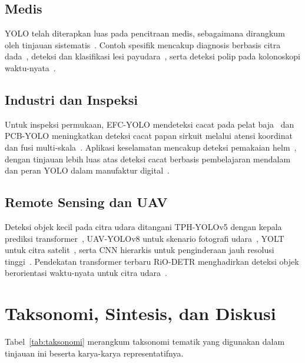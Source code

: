 \documentclass[11pt,a4paper]{article}
\begin{document}
\subsection{Medis}
YOLO telah diterapkan luas pada pencitraan medis, sebagaimana dirangkum oleh
tinjauan sistematis~\cite{qureshi2024medyolo}. Contoh spesifik mencakup diagnosis
berbasis citra dada~\cite{alantari2020covid}, deteksi dan klasifikasi lesi
payudara~\cite{baccouche2021breast,mohiyuddin2022breast}, serta deteksi polip
pada kolonoskopi waktu-nyata~\cite{wan2023polyp}.

\subsection{Industri dan Inspeksi}
Untuk inspeksi permukaan, EFC-YOLO mendeteksi cacat pada pelat
baja~\cite{yang2023efcyolo} dan PCB-YOLO meningkatkan deteksi cacat papan sirkuit
melalui atensi koordinat dan fusi multi-skala~\cite{tang2024pcbyolo}. Aplikasi
keselamatan mencakup deteksi pemakaian helm~\cite{zhou2021helmet}, dengan tinjauan
lebih luas atas deteksi cacat berbasis pembelajaran mendalam~\cite{jha2023defectreview}
dan peran YOLO dalam manufaktur digital~\cite{hussain2023yolo}.

\subsection{Remote Sensing dan UAV}
Deteksi objek kecil pada citra udara ditangani TPH-YOLOv5 dengan kepala prediksi
transformer~\cite{zhu2021tphyolov5}, UAV-YOLOv8 untuk skenario fotografi
udara~\cite{wang2023uavyolo}, YOLT untuk citra satelit~\cite{vanetten2018yolt},
serta CNN hierarkis untuk penginderaan jauh resolusi
tinggi~\cite{zhang2019remotesensing}. Pendekatan transformer terbaru RiO-DETR
menghadirkan deteksi objek berorientasi waktu-nyata untuk citra
udara~\cite{hu2026riodetr}.

\section{Taksonomi, Sintesis, dan Diskusi}
Tabel~\ref{tab:taksonomi} merangkum taksonomi tematik yang digunakan dalam
tinjauan ini beserta karya-karya representatifnya.
\end{document}
